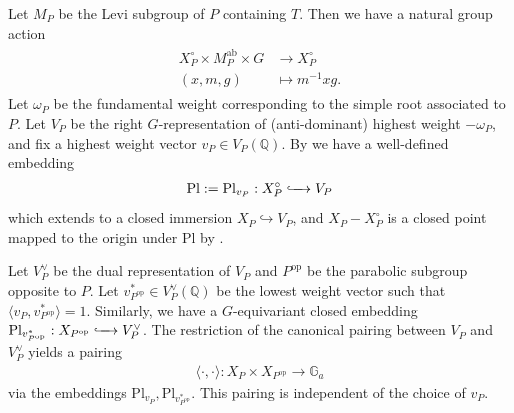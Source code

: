 \documentclass[11pt,a4paper,usenames,dvipsnames,reqno]{amsart}
\numberwithin{equation}{section}
\newcommand{\qq}{\mathbb Q}
\theoremstyle{definition}
\theoremstyle{remark}
\begin{document}
Let $M_P$ be the Levi subgroup of $P$ containing $T$. Then we have a natural group action
\begin{align}\label{eq:action}
\begin{split}
     X_P^\circ \times M_P^{\mathrm{ab}}\times G &\longrightarrow X_P^\circ\\
    (x,m,g)&\longmapsto m^{-1}xg.
\end{split}
\end{align}
 Let $\omega_P$ be the fundamental weight corresponding to the simple root associated to $P$. Let $V_P$ be the right $G$-representation of (anti-dominant) highest weight $-\omega_P$, and fix a highest weight vector $v_P\in V_P(\qq)$. By \cite[Lemma 3.4]{Getz:Hsu:Leslie} we have a well-defined embedding
\begin{align*}
\mathrm{Pl}:=\mathrm{Pl}_{v_P}:X_P^\circ\lhook\joinrel\xrightarrow{\quad} V_P
\end{align*}
which extends to a closed immersion $X_P\hookrightarrow V_P$, and $X_P-X_P^\circ$ is a closed point mapped to the origin under $\mathrm{Pl}$ by \cite[Theorems 1 and 2]{Popov:Vinberg}.


    
Let $V_P^\lor$ be the dual representation of $V_P$ and $P^{\mathrm{op}}$ be the parabolic subgroup opposite to $P$. Let $v_{P^{\mathrm{op}}}^*\in V_P^{\lor}(\qq)$ be the lowest weight vector such that $\langle v_P,v_{P^{\mathrm{op}}}^*\rangle=1 $. Similarly, we have a  $G$-equivariant closed embedding $\mathrm{Pl}_{v^\ast_{P^{\mathrm{op}}}}: X_{P^{\mathrm{op}}}\lhook\joinrel\xrightarrow{\quad}V_P^\lor$. The restriction of the canonical pairing between $V_P$ and $V_P^\lor$ yields a pairing 
\begin{align*}
   \langle \cdot ,\cdot\rangle :X_P\times X_{P^{\mathrm{op}}}\longrightarrow \mathbb{G}_a 
\end{align*}
via the embeddings $\mathrm{Pl}_{v_P},\mathrm{Pl}_{v_{P^{\mathrm{op}}}^\ast}$. This pairing is independent of the choice of $v_P$.
\end{document}

